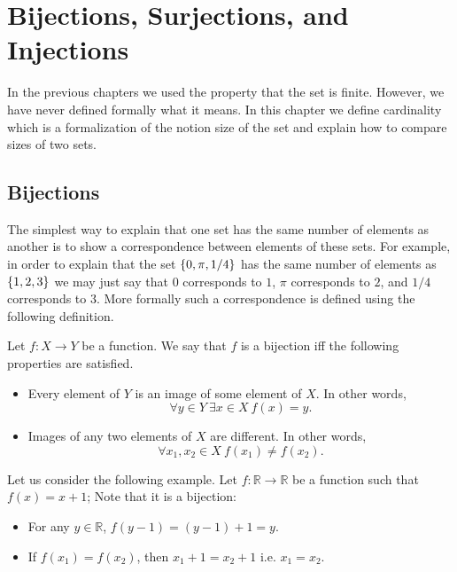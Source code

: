 \chapter{Bijections, Surjections, and Injections}
\label{chapter:bijections-surjections-injections}

In the previous chapters we used the property that the set is finite. However,
we have never defined formally what it means. In this chapter we define
cardinality which is a formalization of the notion size of the set and explain
how to compare sizes of two sets.

\section{Bijections}
The simplest way to explain that one set has the same number of elements as
another is to show a correspondence between elements of these sets. For example,
in order to explain that the set $\set{0, \pi, 1 / 4}$ has the same number of
elements as $\set{1, 2, 3}$ we may just say that $0$ corresponds to $1$,
$\pi$ corresponds to $2$, and $1 / 4$ corresponds to $3$. More formally such a
correspondence is defined using the following definition.
\begin{definition}
    Let $f : X \to Y$ be a function. We say that $f$ is a bijection iff the
    following properties are satisfied.
    \begin{itemize}
        \item Every element of $Y$ is an image of some element of $X$. In other
            words,
            \[
                \forall y \in Y~\exists x \in X\ f(x) = y.
            \]
        \item Images of any two elements
            of $X$ are different. In other words,
            \[
                \forall x_1, x_2 \in X\ f(x_1) \neq f(x_2).
            \]
    \end{itemize}
\end{definition}

Let us consider the following example. Let $f : \mathbb{R} \to \mathbb{R}$ be a
function such that $f(x) = x + 1$; Note that it is a bijection:
\begin{itemize}
    \item For any $y \in \mathbb{R}$, $f(y - 1) = (y - 1) + 1 = y$.
    \item If $f(x_1) = f(x_2)$, then $x_1 + 1 = x_2 + 1$ i.e. $x_1 = x_2$.
\end{itemize}


